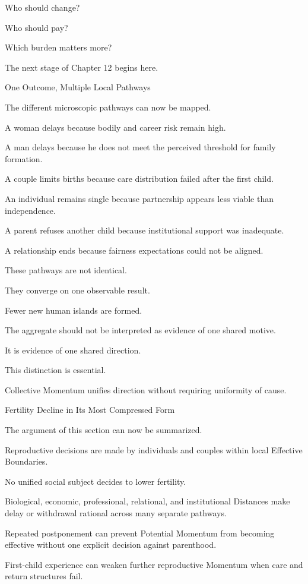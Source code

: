 Who should change?

Who should pay?

Which burden matters more?

The next stage of Chapter 12 begins here.

One Outcome, Multiple Local Pathways

The different microscopic pathways can now be mapped.

A woman delays because bodily and career risk remain high.

A man delays because he does not meet the perceived threshold for family formation.

A couple limits births because care distribution failed after the first child.

An individual remains single because partnership appears less viable than independence.

A parent refuses another child because institutional support was inadequate.

A relationship ends because fairness expectations could not be aligned.

These pathways are not identical.

They converge on one observable result.

Fewer new human islands are formed.

The aggregate should not be interpreted as evidence of one shared motive.

It is evidence of one shared direction.

This distinction is essential.

Collective Momentum unifies direction without requiring uniformity of cause.

Fertility Decline in Its Most Compressed Form

The argument of this section can now be summarized.

Reproductive decisions are made by individuals and couples within local Effective Boundaries.

No unified social subject decides to lower fertility.

Biological, economic, professional, relational, and institutional Distances make delay or withdrawal rational across many separate pathways.

Repeated postponement can prevent Potential Momentum from becoming effective without one explicit decision against parenthood.

First-child experience can weaken further reproductive Momentum when care and return structures fail.

